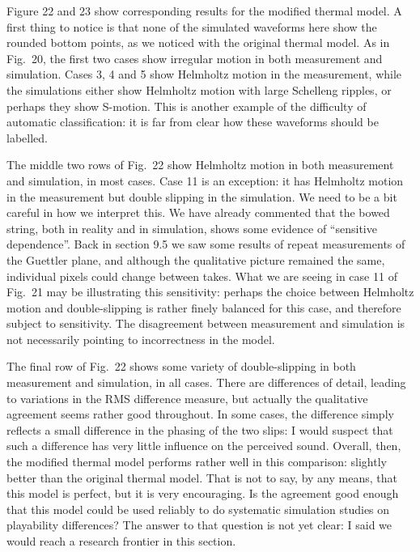 
  Figure 22 and 23 show corresponding results for the modified thermal model. A 
  first thing to notice is that none of the simulated waveforms here show the 
  rounded bottom points, as we noticed with the original thermal model. As in 
  Fig.\ 20, the first two cases show irregular motion in both measurement and 
  simulation. Cases 3, 4 and 5 show Helmholtz motion in the measurement, while 
  the simulations either show Helmholtz motion with large Schelleng ripples, or 
  perhaps they show S-motion. This is another example of the difficulty of 
  automatic classification: it is far from clear how these waveforms should be 
  labelled. 



  The middle two rows of Fig.\ 22 show Helmholtz motion in both measurement and 
  simulation, in most cases. Case 11 is an exception: it has Helmholtz motion 
  in the measurement but double slipping in the simulation. We need to be a bit 
  careful in how we interpret this. We have already commented that the bowed 
  string, both in reality and in simulation, shows some evidence of “sensitive 
  dependence”. Back in section 9.5 we saw some results of repeat measurements 
  of the Guettler plane, and although the qualitative picture remained the 
  same, individual pixels could change between takes. What we are seeing in 
  case 11 of Fig.\ 21 may be illustrating this sensitivity: perhaps the choice 
  between Helmholtz motion and double-slipping is rather finely balanced for 
  this case, and therefore subject to sensitivity. The disagreement between 
  measurement and simulation is not necessarily pointing to incorrectness in 
  the model. 

  The final row of Fig.\ 22 shows some variety of double-slipping in both 
  measurement and simulation, in all cases. There are differences of detail, 
  leading to variations in the RMS difference measure, but actually the 
  qualitative agreement seems rather good throughout. In some cases, the 
  difference simply reflects a small difference in the phasing of the two 
  slips: I would suspect that such a difference has very little influence on 
  the perceived sound. Overall, then, the modified thermal model performs 
  rather well in this comparison: slightly better than the original thermal 
  model. That is not to say, by any means, that this model is perfect, but it 
  is very encouraging. Is the agreement good enough that this model could be 
  used reliably to do systematic simulation studies on playability differences? 
  The answer to that question is not yet clear: I said we would reach a 
  research frontier in this section. 


